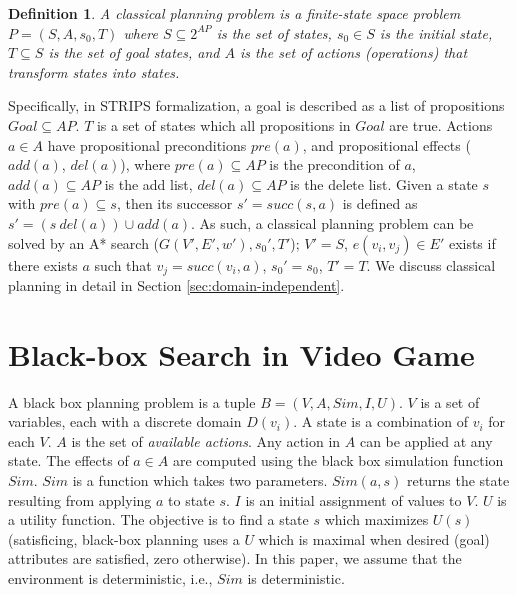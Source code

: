 \documentclass{book}
\newtheorem{definition}{Definition}
\begin{document}
\begin{definition}
A classical planning problem is a finite-state space problem $P = (S,A,s_0,T)$ where $S \subseteq 2^{AP}$ is the set of states, $s_0 \in S$ is the initial state, $T \subseteq S$ is the set of goal states, and $A$ is the set of actions (operations) that transform states into states.
\end{definition}

Specifically, in STRIPS formalization, a goal is described as a list of propositions $Goal \subseteq AP$. $T$ is a set of states which all propositions in $Goal$ are true.
Actions $a \in A$ have propositional preconditions $pre(a)$, and propositional effects ($add(a)$, $del(a)$), where $pre(a) \subseteq AP$ is the precondition of $a$, $add(a) \subseteq AP$ is the add list, $del(a) \subseteq AP$ is the delete list. Given a state $s$ with $pre(a) \subseteq s$, then its successor $s' = succ(s, a)$ is defined as $s' = (s \ del(a)) \cup add(a)$.
As such, a classical planning problem can be solved by an A* search ($G(V', E', w'), s_0', T'$); $V' = S$, $e(v_i, v_j) \in E'$ exists if there exists $a$ such that $v_j = succ(v_i, a)$, $s_0' = s_0$, $T' = T$.
We discuss classical planning in detail in Section \ref{sec:domain-independent}.

\section{Black-box Search in Video Game}
A black box planning problem is a tuple $B=  (V, A, Sim, I, U)$.
$V$ is a set of variables, each with a discrete domain $D(v_i)$. A state is a combination of $v_i$ for each $V$.
$A$ is the set of \emph{available actions}. Any action in $A$ can be applied at any state. The effects of $a \in A$ are computed using the black box simulation function $Sim$.
$Sim$ is a function which takes two parameters. $Sim(a,s)$ returns the state resulting from applying $a$ to state $s$.
$I$ is an initial assignment of values to $V$.
$U$ is a utility function.
The objective is to find a state $s$ which maximizes $U(s)$ (satisficing, black-box planning uses a $U$  which is maximal when desired (goal) attributes are satisfied, zero otherwise).
In this paper, we assume that the environment is deterministic, i.e., $Sim$ is deterministic.
\end{document}
